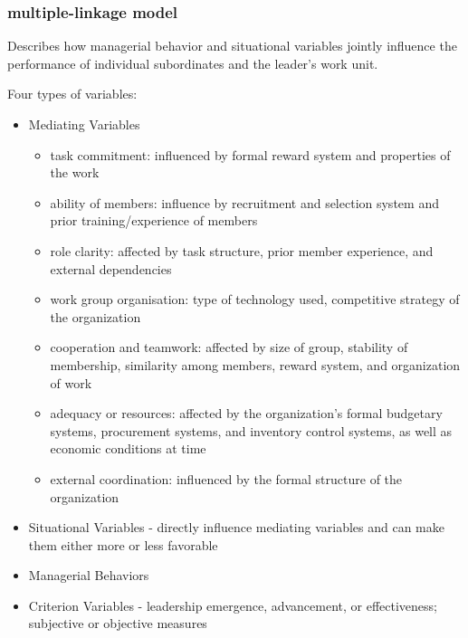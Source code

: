 
\subsubsection{multiple-linkage model} %
\label{ssub:multiple_linkage_model}
	Describes how managerial behavior and situational variables jointly influence the performance of individual subordinates and the leader’s work unit. 

	Four types of variables:
	\begin{itemize}
		\item Mediating Variables
		\begin{itemize}
			\item task commitment: influenced by formal reward system and properties of the work
			\item ability of members: influence by recruitment and selection system and prior training/experience of members
			\item role clarity: affected by task structure, prior member experience, and external dependencies
			\item work group organisation: type of technology used, competitive strategy of the organization
			\item cooperation and teamwork: affected by size of group, stability of membership, similarity among members, reward system, and organization of work
			\item adequacy or resources: affected by the organization’s formal budgetary systems, procurement systems, and inventory control systems, as well as economic conditions at time
			\item external coordination: influenced by the formal structure of the organization
		\end{itemize}
		\item Situational Variables - directly influence mediating variables and can make them either more or less favorable
		\item Managerial Behaviors
		\item Criterion Variables - leadership emergence, advancement, or effectiveness; subjective or objective measures
	\end{itemize}
